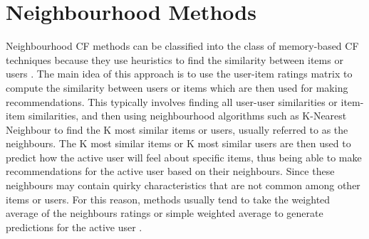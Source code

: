 
\section{Neighbourhood Methods}

Neighbourhood CF methods can be classified into the class of memory-based CF techniques because they use heuristics to find the similarity between items or users \cite{schafer2007collaborative}. The main idea of this approach is to use the user-item ratings matrix to compute the similarity between users or items which are then used for making recommendations. This typically involves finding all user-user similarities or item-item similarities, and then using neighbourhood algorithms such as K-Nearest Neighbour to find the K most similar items or users, usually referred to as the neighbours. The K most similar items or K most similar users are then used to predict how the active user will feel about specific items, thus being able to make recommendations for the active user based on their neighbours. Since these neighbours may contain quirky characteristics that are not common among other items or users. For this reason, methods usually tend to take the weighted average of the neighbours ratings or simple weighted average to generate predictions for the active user \cite{survey}. 

